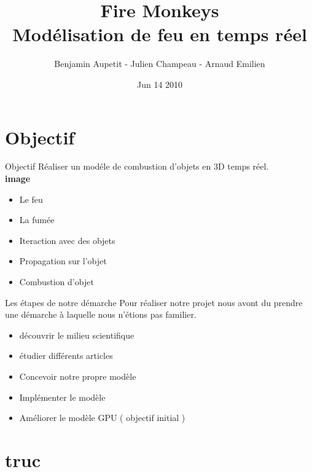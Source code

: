 \documentclass{beamer}
\title{Fire Monkeys\\ Modélisation de feu en temps réel}
\author{Benjamin Aupetit - Julien Champeau - Arnaud Emilien}
\date{Jun 14 2010}
\begin{document}
\begin{frame}
   \titlepage
\end{frame}

\begin{frame}
  \tableofcontents
\end{frame}

\section{Objectif}
\begin{frame}{Objectif}
  Réaliser un modéle de combustion d'objets en 3D temps réel.\\
  \textbf{image}
  \begin{itemize}
    \item{Le feu}%
    \item{La fumée}%
    \item{Iteraction avec des objets}%
    \item{Propagation sur l'objet}%
    \item{Combustion d'objet}%
  \end{itemize}
\end{frame}

\begin{frame}{Les étapes de notre démarche}
  Pour réaliser notre projet nous avont du prendre une démarche à laquelle nous n'étions pas familier.\\
  \begin{itemize}
  \item{découvrir le milieu scientifique} %
  \item{étudier différents articles} %
  \item{Concevoir notre propre modèle} %
  \item{Implémenter le modèle} %
  \item{Améliorer le modèle} GPU ( objectif initial ) %
  \end{itemize}
\end{frame}

\section{truc}
\end{document}
